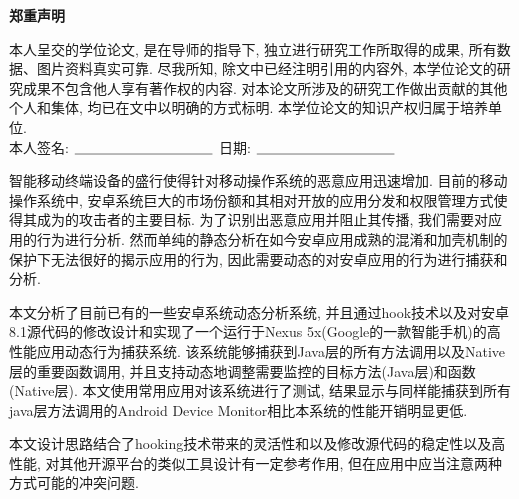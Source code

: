 


\newpage
\vspace*{20pt}
\begin{center}{\textbf{\songti{} 郑重声明}}\end{center}
\par\vspace*{30pt}
\renewcommand{\baselinestretch}{2}

{%

本人呈交的学位论文, 是在导师的指导下, 独立进行研究工作所取得的成果,
所有数据、图片资料真实可靠. 尽我所知, 除文中已经注明引用的内容外,
本学位论文的研究成果不包含他人享有著作权的内容.
对本论文所涉及的研究工作做出贡献的其他个人和集体,
均已在文中以明确的方式标明. 本学位论文的知识产权归属于培养单位.\\[2cm]

\hspace*{1cm}本人签名: $\underline{\hspace{3.5cm}}$
\hspace{2cm}日期: $\underline{\hspace{3.5cm}}$\hfill\par}
\baselineskip=23pt  %





\begin{cnabstract}
智能移动终端设备的盛行使得针对移动操作系统的恶意应用迅速增加. 目前的移动操作系统中, 安卓系统巨大的市场份额和其相对开放的应用分发和权限管理方式使得其成为的攻击者的主要目标. 为了识别出恶意应用并阻止其传播, 我们需要对应用的行为进行分析. 然而单纯的静态分析在如今安卓应用成熟的混淆和加壳机制的保护下无法很好的揭示应用的行为, 因此需要动态的对安卓应用的行为进行捕获和分析. 

本文分析了目前已有的一些安卓系统动态分析系统, 并且通过hook技术以及对安卓8.1源代码的修改设计和实现了一个运行于Nexus 5x(Google的一款智能手机)的高性能应用动态行为捕获系统. 该系统能够捕获到Java层的所有方法调用以及Native层的重要函数调用, 并且支持动态地调整需要监控的目标方法(Java层)和函数(Native层). 本文使用常用应用对该系统进行了测试, 结果显示与同样能捕获到所有java层方法调用的Android Device Monitor相比本系统的性能开销明显更低.

本文设计思路结合了hooking技术带来的灵活性和以及修改源代码的稳定性以及高性能, 对其他开源平台的类似工具设计有一定参考作用, 但在应用中应当注意两种方式可能的冲突问题.




\end{cnabstract}
\par
\vspace*{2em}


